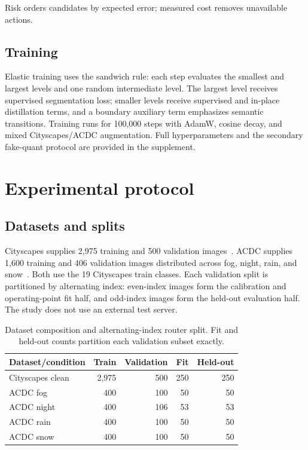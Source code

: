 \documentclass[a4paper,review,12pt]{elsarticle}
\begin{document}
Risk orders candidates by expected error; measured cost removes unavailable actions.

\subsection{Training}

Elastic training uses the sandwich rule: each step evaluates the smallest and largest levels and one random intermediate level. The largest level receives supervised segmentation loss; smaller levels receive supervised and in-place distillation terms, and a boundary auxiliary term emphasizes semantic transitions. Training runs for 100,000 steps with AdamW, cosine decay, and mixed Cityscapes/ACDC augmentation. Full hyperparameters and the secondary fake-quant protocol are provided in the supplement.

\section{Experimental protocol}
\label{sec:protocol}

\subsection{Datasets and splits}

Cityscapes supplies 2,975 training and 500 validation images~\cite{cordts2016cityscapes}. ACDC supplies 1,600 training and 406 validation images distributed across fog, night, rain, and snow~\cite{sakaridis2021acdc}. Both use the 19 Cityscapes train classes. Each validation split is partitioned by alternating index: even-index images form the calibration and operating-point fit half, and odd-index images form the held-out evaluation half. The study does not use an external test server.

\begin{table}[H]
\centering
\caption{Dataset composition and alternating-index router split. Fit and held-out counts partition each validation subset exactly.}
\label{tab:dataset-splits}
\small
\begin{tabular}{@{}lrrrr@{}}
\toprule
Dataset/condition & Train & Validation & Fit & Held-out \\
\midrule
Cityscapes clean & 2,975 & 500 & 250 & 250 \\
ACDC fog   & 400 & 100 & 50 & 50 \\
ACDC night & 400 & 106 & 53 & 53 \\
ACDC rain  & 400 & 100 & 50 & 50 \\
ACDC snow  & 400 & 100 & 50 & 50 \\
\bottomrule
\end{tabular}
\end{table}
\end{document}
